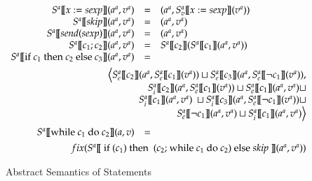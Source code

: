 \documentclass{llncs}
\newcommand{\aset}[1]{\ensuremath{#1^a}}
\newcommand{\ael}[1]{\aset{#1}}
\newcommand{\blangle}{\big\langle}
\newcommand{\brangle}{\big\rangle}
\begin{document}
\begin{figure}[H]
{\small \[
\begin{array}{rcl}
\ael{S} [\![x := sexp ]\!](\ael{a}, \ael{v}) & = & (\ael{a}, \ael{S}_v [\![x := sexp ]\!](\ael{v})) \\
S^a[\![skip]\!](a^a, v^a) & = & (a^a, v^a) \\
\ael{S} [\![send(sexp) ]\!](\ael{a}, \ael{v}) & = & (\ael{a}, \ael{v})\\
\ael{S} [\![c_1 ; c_2 ]\!](\ael{a}, \ael{v}) & = &  \ael{S} [\![c_2 ]\!](\ael{S} [\![c_1 ]\!](\ael{a}, \ael{v}) ) \qquad\qquad\qquad \\
S^a [\![\mbox{if } c_1 \mbox{ then } c_2  \mbox{ else }c_3 ]\!](a^a, v^a) & = &  \\[0.15cm]
\multicolumn{3}{r}{\blangle  S_e^a [\![c_2 ]\!](a^a, S_e^a[\![c_1 ]\!](v^a)) \sqcup S_e^a [\![c_3 ]\!](a^a, S_e^a[\![\neg c_1 ]\!](v^a))  , }\\
\multicolumn{3}{r}{S_i^a [\![c_2 ]\!](a^a, S_e^a[\![c_1 ]\!](v^a)) \sqcup S_e^a [\![c_1 ]\!](a^a, v^a) \sqcup}\\
\multicolumn{3}{r}{S_i^a [\![c_1 ]\!](a^a, v^a)\ \sqcup S_i^a [\![c_3 ]\!](a^a, S_e^a[\![\neg c_1 ]\!](v^a)) \sqcup }\\
\multicolumn{3}{r}{S_e^a [\![\neg c_1 ]\!](a^a, v^a) \sqcup  S_i^a [\![c_1 ]\!](a^a, v^a)\brangle}\\[0.25cm]
S^a [\![\mbox{while } c_1 \mbox{ do } c_2]\!](a, v) & = & \\[0.15cm]
\multicolumn{3}{r}{fix ( S^a [\![\mbox{ if } (c_1) \mbox{ then } \mbox{ (}c_2\mbox{; while } c_1 \mbox{ do } c_2 )  \mbox{ else \textit{skip} } ]\!](a^a, v^a) )} \\
\end{array}
\]}
\caption{Abstract Semantics of Statements}
\label{abs_sem_stm}
\end{figure}
\end{document}
